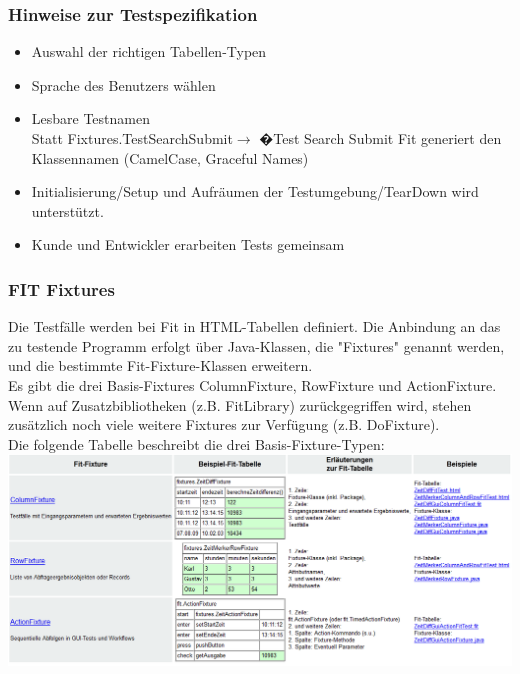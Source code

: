 \documentclass[a4paper,10pt]{article}
\begin{document}
\subsubsection{Hinweise zur Testspezifikation}
\begin{itemize}
\item Auswahl der richtigen Tabellen-Typen
\item Sprache des Benutzers w\"ahlen
\item Lesbare Testnamen\\
Statt Fixtures.TestSearchSubmit$ \rightarrow$ �Test Search Submit
Fit generiert den Klassennamen (CamelCase, Graceful Names)
\item Initialisierung/Setup und Aufr\"aumen der Testumgebung/TearDown wird unterst\"utzt.
\item Kunde und Entwickler erarbeiten Tests gemeinsam
\end{itemize}

\subsubsection{FIT Fixtures}
Die Testf\"alle werden bei Fit in HTML-Tabellen definiert. Die Anbindung an das zu testende Programm erfolgt über Java-Klassen, die "Fixtures" genannt werden, und die bestimmte Fit-Fixture-Klassen erweitern.\\
Es gibt die drei Basis-Fixtures ColumnFixture, RowFixture und ActionFixture. Wenn auf Zusatzbibliotheken (z.B. FitLibrary) zurückgegriffen wird, stehen zus\"atzlich noch viele weitere Fixtures zur Verfügung (z.B. DoFixture).\\
Die folgende Tabelle beschreibt die drei Basis-Fixture-Typen:\\
\includegraphics[scale=0.55]{FIT_Fixtures.png}
\end{document}
